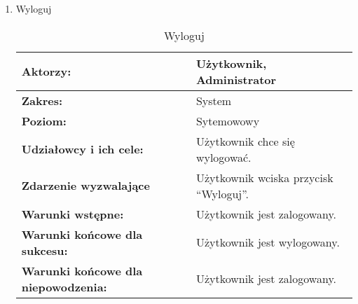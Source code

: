 \begin{enumerate}[label=(\Roman*)]
	\item Wyloguj
	\begin{table}[h]
\centering
\caption{Wyloguj}
\label{wyloguj}
\begin{tabular}{|p{7cm}|p{7cm}|}
  \hline 
  \textbf{Aktorzy:} & Użytkownik, Administrator\\
  \hline
  \textbf{Zakres:} & System \\
	\hline
  \textbf{Poziom:} & Sytemowowy \\
	\hline
  \textbf{Udziałowcy i ich cele: } & Użytkownik chce się wylogować. \\
	\hline
  \textbf{Zdarzenie wyzwalające } & Użytkownik wciska przycisk “Wyloguj”. \\
	\hline
  \textbf{Warunki wstępne: } & Użytkownik jest zalogowany.
 \\
	\hline
  \textbf{Warunki końcowe dla sukcesu:} & Użytkownik jest wylogowany.
 \\
	\hline
  \textbf{Warunki końcowe dla niepowodzenia:} & Użytkownik jest zalogowany. \\
  \hline
\end{tabular} 
\end{table}


\end{enumerate}
